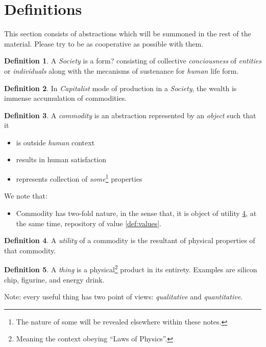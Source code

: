 \documentclass[12pt]{extarticle}
\theoremstyle{definition}
\newtheorem{definition}{Definition}[section]
\newenvironment{remark}[1][Remark]{\begin{trivlist}
\item[\hskip \labelsep {\bfseries #1}]}{\end{trivlist}}
\begin{document}
\section{Definitions}
This section consists of abstractions which will be summoned in the rest of the material.  Please try to be as cooperative as possible with them.

\begin{definition}
  A \emph{Society} is a form? consisting of collective \emph{conciousness} of \emph{entities} or \emph{individuals} along with the mecanisms of sustenance for \emph{human} life form.  
  \end{definition}

\begin{definition}
  In \emph{Capitalist} mode of production in a \emph{Society}, the wealth is immense accumulation of commodities.
\end{definition}

\begin{definition}
  \label{def:commodity}
  A \emph{commodity} is an abstraction represented by an \emph{object} such that it
  \begin{itemize}
  \item is outside \emph{human} context
  \item results in human satisfaction
  \item represents collection of \emph{some}\footnote{The nature of some will be revealed elsewhere within these notes.} properties
  \end{itemize} 
\end{definition}

\begin{remark}
  We note that:
  \begin{itemize}
  \item Commodity has two-fold nature, in the sense that, it is object of utility \ref{def:utility}, at the same time, repository of value \ref{def:values}.
  \end{itemize}
\end{remark}

\begin{definition}
  \label{def:utility}
  A \emph{utility} of a commodity is the resultant of physical properties of that commodity.
\end{definition}

\begin{definition}
 \label{def:thing}
  A \emph{thing} is a physical\footnote{Meaning the context obeying ``Laws of Physics''.} product in its entirety.  Examples are silicon chip, figurine, and energy drink.
\end{definition}
Note: every useful thing has two point of views: \emph{qualitative} and \emph{quantitative}.
\end{document}
